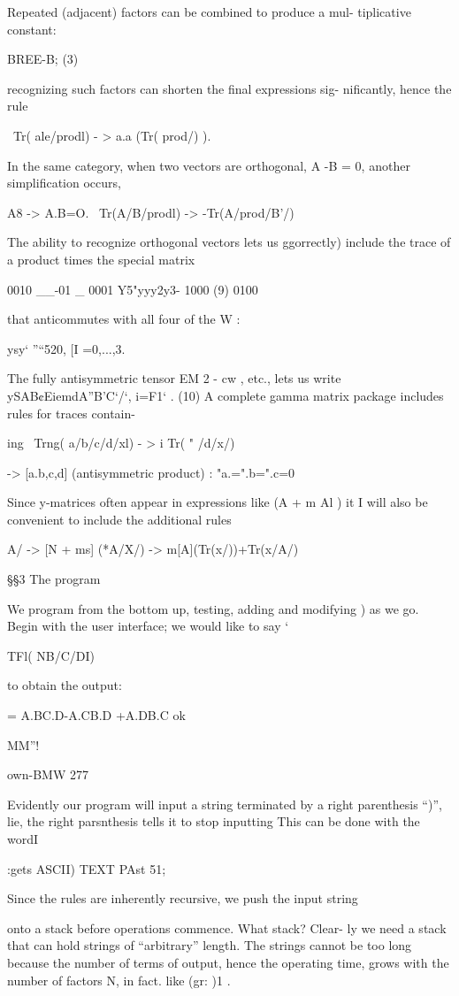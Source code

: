 Repeated (adjacent) factors can be combined to produce a mul-
tiplicative constant:

BREE-B; (3)

recognizing such factors can shorten the ﬁnal expressions sig-
niﬁcantly, hence the rule

\ Tr( ale/prodl) - > a.a (Tr( prod/) ).

In the same category, when two vectors are orthogonal,
A -B = 0, another simpliﬁcation occurs,

\PERP A8 -> A.B=O.
\ Tr(A/B/prodl) -> -Tr(A/prod/B'/)

The ability to recognize orthogonal vectors lets us ggorrectly)
include the trace of a product times the special matrix

0010
__-01 _ 0001
Y5"yyy2y3- 1000 (9)
0100

that anticommutes with all four of the W :

ysy‘ ”“520, [I =0,...,3.

The fully antisymmetric tensor EM 2 - cw , etc., lets us write
ySAB¢EiemdA”B’C‘/‘, i=F1‘ . (10)
A complete gamma matrix package includes rules for traces contain-

ing
\ Trng( a/b/c/d/xl) - > i Tr( " /d/x/)

-> [a.b,c,d] (antisymmetric product)
\Note: "a.=".b=".c=0

 

Since y-matrices often appear in expressions like (A + m Al ) it I
will also be convenient to include the additional rules

\*A/ -> [N + ms]
\Tr(*A/X/) -> m[A](Tr(x/))+Tr(x/A/)

§§3 The program

We program from the bottom up, testing, adding and modifying )
as we go. Begin with the user interface; we would like to say ‘

TFl( NB/C/DI)

to obtain the output:

= A.BC.D-A.CB.D +A.DB.C ok

MM”!

own-BMW 277

Evidently our program will input a string terminated by a right
parenthesis “)”, lie, the right parsnthesis tells it to stop inputting
This can be done with the wordI

:gets ASCII) TEXT PAst 51;

Since the rules are inherently recursive, we push the input string

onto a stack before operations commence. What stack? Clear-
ly we need a stack that can hold strings of “arbitrary” length. The
strings cannot be too long because the number of terms of output,
hence the operating time, grows with the number of factors N, in
fact. like (gr: )1 .

